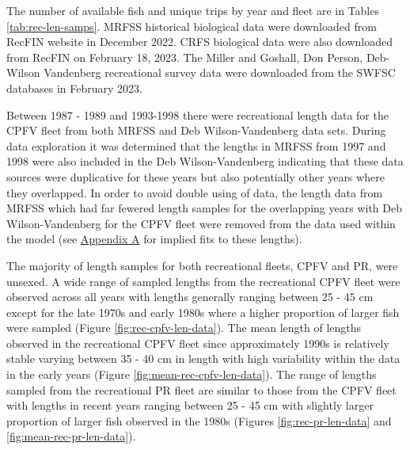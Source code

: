 \documentclass[11pt,
  english,
  letterpaper,
]{article}
\begin{document}
The number of available fish and unique trips by year and fleet are in Tables \ref{tab:rec-len-samps}. MRFSS historical biological data were downloaded from RecFIN website in December 2022. CRFS biological data were also downloaded from RecFIN on February 18, 2023. The Miller and Goshall, Don Person, Deb-Wilson Vandenberg recreational survey data were downloaded from the SWFSC databases in February 2023.

Between 1987 - 1989 and 1993-1998 there were recreational length data for the CPFV fleet from both MRFSS and Deb Wilson-Vandenberg data sets. During data exploration it was determined that the lengths in MRFSS from 1997 and 1998 were also included in the Deb Wilson-Vandenberg indicating that these data sources were duplicative for these years but also potentially other years where they overlapped. In order to avoid double using of data, the length data from MRFSS which had far fewered length samples for the overlapping years with Deb Wilson-Vandenberg for the CPFV fleet were removed from the data used within the model (see \protect\hyperlink{excluded-data}{Appendix A} for implied fits to these lengths).

The majority of length samples for both recreational fleets, CPFV and PR, were unsexed. A wide range of sampled lengths from the recreational CPFV fleet were observed across all years with lengths generally ranging between 25 - 45 cm except for the late 1970s and early 1980s where a higher proportion of larger fish were sampled (Figure \ref{fig:rec-cpfv-len-data}). The mean length of lengths observed in the recreational CPFV fleet since approximately 1990s is relatively stable varying between 35 - 40 cm in length with high variability within the data in the early years (Figure \ref{fig:mean-rec-cpfv-len-data}). The range of lengths sampled from the recreational PR fleet are similar to those from the CPFV fleet with lengths in recent years ranging between 25 - 45 cm with slightly larger proportion of larger fish observed in the 1980s (Figures \ref{fig:rec-pr-len-data} and \ref{fig:mean-rec-pr-len-data}).
\end{document}
